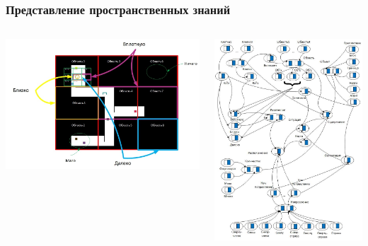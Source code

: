 	\begin{frame}
		\frametitle{Представление пространственных знаний}
		
		\begin{columns}
			\begin{column}{0.55\textwidth}
				\includegraphics[width=\textwidth]{areas.jpg}
			\end{column}
			\begin{column}{0.45\textwidth}
				\includegraphics[width=\textwidth]{areas_signif.jpg}
			\end{column}
		\end{columns}
	\end{frame}
